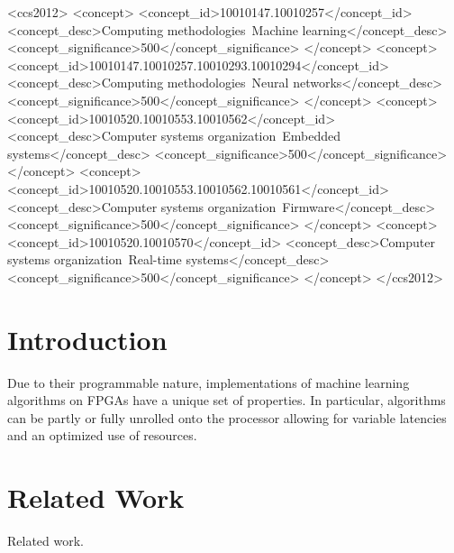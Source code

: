 \documentclass[sigchi]{acmart}
\begin{document}
\begin{CCSXML}
<ccs2012>
<concept>
<concept_id>10010147.10010257</concept_id>
<concept_desc>Computing methodologies~Machine learning</concept_desc>
<concept_significance>500</concept_significance>
</concept>
<concept>
<concept_id>10010147.10010257.10010293.10010294</concept_id>
<concept_desc>Computing methodologies~Neural networks</concept_desc>
<concept_significance>500</concept_significance>
</concept>
<concept>
<concept_id>10010520.10010553.10010562</concept_id>
<concept_desc>Computer systems organization~Embedded systems</concept_desc>
<concept_significance>500</concept_significance>
</concept>
<concept>
<concept_id>10010520.10010553.10010562.10010561</concept_id>
<concept_desc>Computer systems organization~Firmware</concept_desc>
<concept_significance>500</concept_significance>
</concept>
<concept>
<concept_id>10010520.10010570</concept_id>
<concept_desc>Computer systems organization~Real-time systems</concept_desc>
<concept_significance>500</concept_significance>
</concept>
</ccs2012>
\end{CCSXML}





\maketitle

\section{Introduction}
Due to their programmable nature, implementations of machine learning algorithms on FPGAs have a
unique set of properties. In particular, algorithms can be partly or
fully unrolled onto the processor allowing for variable latencies and an optimized use of
resources. 

\section{Related Work}
Related work.
\end{document}
